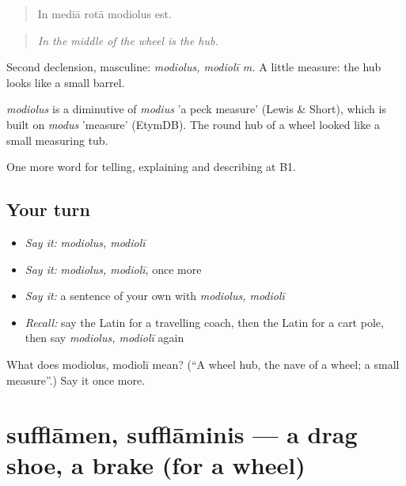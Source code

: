 \begin{quote}
In mediā rotā modiolus est.
\end{quote}

\begin{quote}
\emph{In the middle of the wheel is the hub.}
\end{quote}

Second declension, masculine: \emph{modiolus, modiolī m.} A little measure: the hub looks like a small barrel.

\begin{cousinweb}
\emph{modiolus} is a diminutive of \emph{modius} 'a peck measure' (Lewis \& Short), which is built on \emph{modus} 'measure' (EtymDB). The round hub of a wheel looked like a small measuring tub.
\end{cousinweb}

\begin{grammarlens}[title={What you've built}]
One more word for telling, explaining and describing at B1.
\end{grammarlens}

\subsection*{Your turn}
\begin{itemize}
\raggedright
  \item \emph{Say it:} \emph{modiolus, modiolī}
  \item \emph{Say it:} \emph{modiolus, modiolī}, once more
  \item \emph{Say it:} a sentence of your own with \emph{modiolus, modiolī}
  \item \emph{Recall:} say the Latin for a travelling coach, then the Latin for a cart pole, then say \emph{modiolus, modiolī} again
\end{itemize}

\begin{tcolorbox}[breakable,colback=teal!4,colframe=teal!35!black,title={Before you move on}]
What does modiolus, modiolī mean? (\textquotedblleft{}A wheel hub, the nave of a wheel; a small measure\textquotedblright{}.) Say it once more.
\end{tcolorbox}
\section[sufflāmen, sufflāminis]{sufflāmen, sufflāminis — a drag shoe, a brake (for a wheel)}

\label{lesson:LA-C430-sufflamen}



